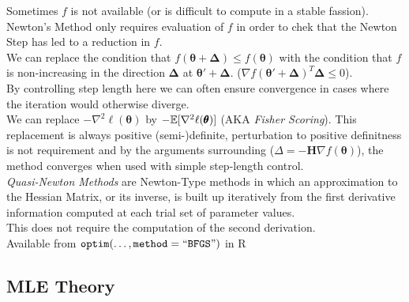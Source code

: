 \documentclass[11pt,a4paper]{article}
\begin{document}
Sometimes $f$ is not available (or is difficult to compute in a stable fassion).\\
Newton's Method only requires evaluation of $f$ in order to chek that the Newton Step has led to a reduction in $f$.\\
We can replace the condition that $f(\pmb\theta+\pmb\Delta)\leq f(\pmb\theta)$ with the condition that $f$ is non-increasing in the direction $\pmb\Delta$ at $\pmb\theta'+\pmb\Delta$. (\ie $\nabla f(\pmb\theta'+\pmb\Delta)^T\pmb\Delta\leq0$).\\
By controlling step length here we can often ensure convergence in cases where the iteration would otherwise diverge.\\

We can replace $-\nabla^2 \ell(\pmb\theta)$ by $-\mathbb{E}[\nabla^2\ell(\pmb\theta)]$ (AKA \textit{Fisher Scoring}). This replacement is always positive (semi-)definite, perturbation to positive definitness is not requirement and by the arguments surrounding ($\Delta=-\textbf{H}\nabla f(\pmb\theta)$), the method converges when used with simple step-length control.\\

\textit{Quasi-Newton Methods} are Newton-Type methods in which an approximation to the Hessian Matrix, or its inverse, is built up iteratively from the first derivative information computed at each trial set of parameter values.\\
This does not require the computation of the second derivation.\\
\nb Available from $\mathtt{optim(\dots,method=``BFGS")}$ in R

\subsection{MLE Theory}
\end{document}
